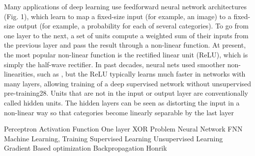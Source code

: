 Many applications of deep learning use feedforward neural network architectures (Fig. 1), which learn to map a fixed-size input (for example, an image) to a fixed-size output (for example, a probability for each of several categories). To go from one layer to the next, a set of units compute a weighted sum of their inputs from the previous layer and pass the result through a non-linear function. At present, the most popular non-linear function is the rectified linear unit (ReLU), which is simply the half-wave rectifier. In past decades, neural nets used smoother non-linearities, such as , but the ReLU typically learns much faster in networks with many layers, allowing training of a deep supervised network without unsupervised pre-training28. Units that are not in the input or output layer are conventionally called hidden units. The hidden layers can be seen as distorting the input in a non-linear way so that categories become linearly separable by the last layer 

Perceptron
Activation Function
One layer
XOR Problem
Neural Network
FNN
Machine Learning, Training 
Supervised Learning
Unsupervised Learning
Gradient Based optimization
Backpropagation 
Honrik 